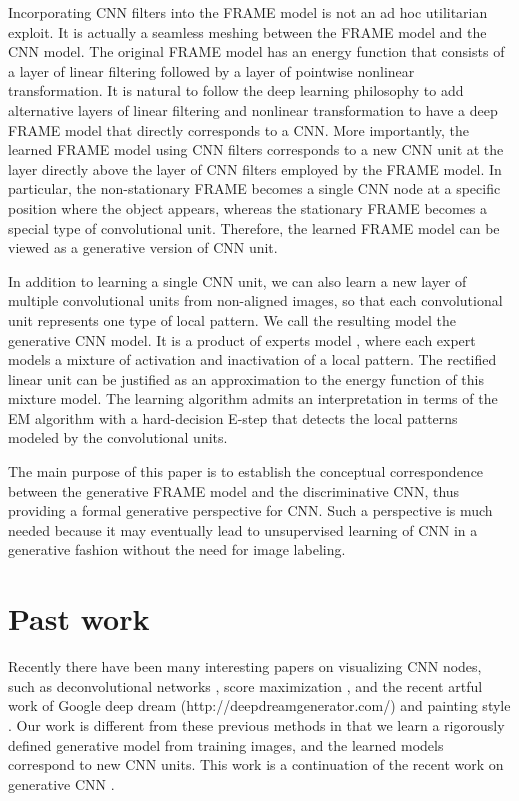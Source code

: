 \documentclass[letterpaper]{article}
\begin{document}
Incorporating CNN filters into the FRAME model is not an ad hoc utilitarian exploit. It is actually a seamless meshing between the FRAME model and the CNN model. The original FRAME model has an energy function that consists of a layer of linear filtering followed by a layer of pointwise nonlinear transformation. It is natural to follow the deep learning philosophy to add alternative layers of linear filtering and nonlinear  transformation to have a deep FRAME model that directly corresponds to a CNN. More importantly, the learned  FRAME model using CNN filters corresponds to a new CNN unit at the layer directly above the layer of CNN filters employed by the FRAME model. In particular, the non-stationary FRAME becomes a single CNN node at a specific position where the object appears, whereas the stationary FRAME becomes a special type of convolutional unit. Therefore, the learned  FRAME model can be viewed as a generative version of CNN unit. 

In addition to learning a single CNN unit, we can also learn a  new layer of multiple convolutional units from non-aligned images, so that each convolutional unit represents one type of local pattern. We call the resulting model the generative CNN model. It is a product of experts model \citep{Hinton2002a}, where each expert models a mixture of activation and inactivation of a local pattern. The rectified linear unit can be justified as an approximation to the energy function of this mixture model. The learning algorithm admits an interpretation in terms of the EM algorithm \citep{dempster1977maximum} with a hard-decision E-step that  detects the local patterns modeled by the convolutional units. 

The main purpose of this paper is to establish the conceptual correspondence between the generative FRAME model and the discriminative CNN, thus providing a  formal generative perspective for CNN. Such a perspective is much needed because it may eventually lead to unsupervised learning of CNN in a generative fashion without the need for image labeling. 

\section{Past work}

Recently there have been many interesting papers on visualizing CNN nodes, such as deconvolutional networks \citep{zeiler2013visualizing}, score maximization \citep{SimonyanCoRR2013}, and the recent artful work of Google deep dream (http://deepdreamgenerator.com/)  and painting style \citep{German2015a}. Our work is different from these previous methods in that we learn a rigorously defined generative model from training images, and the learned models correspond to new CNN units. This work is a continuation of the recent work on generative CNN \citep{Dai2015ICLR}. 
\end{document}

